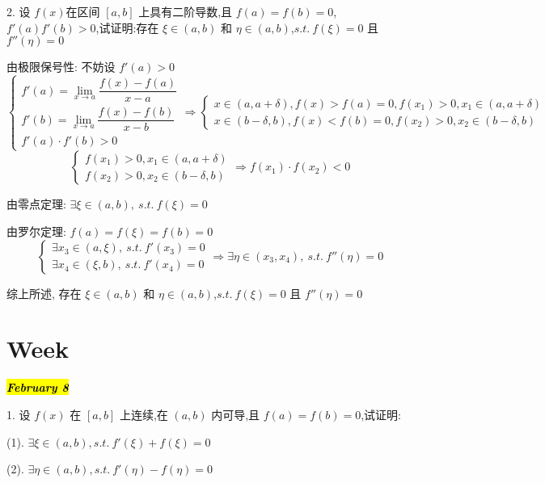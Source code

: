 2. 设 $f(x)$在区间 $[a,b]$ 上具有二阶导数,且 $f(a)=f(b)=0$,$f'(a)f'(b)>0$,试证明:存在 $\xi\in(a,b)$ 和 $\eta\in(a,b)$,$s.t.\ f(\xi)=0$ 且 $f''(\eta)=0$
\begin{solution}

	由极限保号性: 不妨设 $f'(a) > 0$
	$$\begin{cases}
	f'(a) = \lim\limits_{x\to a} \dfrac{f(x)-f(a)}{x-a}\\
	f'(b) = \lim\limits_{x\to a} \dfrac{f(x)-f(b)}{x-b}\\
	f'(a)\cdot f'(b) > 0
	\end{cases}\Rightarrow 
	\begin{cases}
	x\in(a,a+\delta), f(x) > f(a) =0, f(x_{1}) > 0, x_{1}\in(a,a+\delta)\\
	x\in(b-\delta,b), f(x) < f(b) =0, f(x_{2}) > 0, x_{2}\in(b-\delta,b)
	\end{cases}$$
	$$\begin{cases}
	f(x_{1}) > 0, x_{1}\in(a,a+\delta)\\
	f(x_{2}) > 0, x_{2}\in(b-\delta,b)
	\end{cases}\Rightarrow f(x_{1})\cdot f(x_{2}) < 0$$

	由零点定理: $\exists \xi\in(a,b),\ s.t.\ f(\xi) = 0$

	由罗尔定理: $f(a) = f(\xi) =f(b) =0$
	$$\begin{cases}
	\exists x_{3}\in (a,\xi),\ s.t.\ f'(x_{3}) = 0\\
	\exists x_{4}\in (\xi,b),\ s.t.\ f'(x_{4}) = 0
	\end{cases}\Rightarrow \exists \eta\in (x_{3},x_{4}),\ s.t.\ f''(\eta) = 0$$

	综上所述, 存在 $\xi\in(a,b)$ 和 $\eta\in(a,b)$,$s.t.\ f(\xi)=0$ 且 $f''(\eta)=0$
\end{solution}

\section{Week }
\hl{\textbf{\textit{February 8}}}

1. 设 $f(x)$ 在 $[a,b]$ 上连续,在 $(a,b)$ 内可导,且 $f(a)=f(b)=0$,试证明:

(1). $\exists \xi\in(a,b),s.t.\ f'(\xi)+f(\xi)=0$

(2). $\exists \eta\in(a,b),s.t.\ f'(\eta)-f(\eta)=0$


